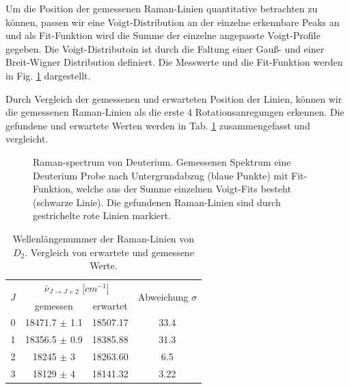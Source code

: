\documentclass[11 pt]{article}
\begin{document}
Um die Position der gemessenen Raman-Linien quantitative betrachten zu können, passen wir eine Voigt-Distribution an der einzelne erkennbare Peaks an und als Fit-Funktion wird die Summe der einzelne angepasste Voigt-Profile gegeben. Die Voigt-Distributoin ist durch die Faltung einer Gauß- und einer Breit-Wigner Distribution definiert. Die Messwerte und die Fit-Funktion werden in Fig. \ref{fig:Deuterium} dargestellt.

Durch Vergleich der gemessenen und erwarteten Position der Linien, können wir die gemessenen Raman-Linien als die erste 4 Rotationsanregungen erkennen. Die gefundene und erwartete Werten werden in Tab. \ref{tab:D2} zusammengefasst und vergleicht. 

\begin{figure}[htbp]
	\centering
   \caption{\small Raman-spectrum von Deuterium. Gemessenen Spektrum eine Deuterium Probe nach Untergrundabzug (blaue Punkte) mit Fit-Funktion, welche aus der Summe einzelnen Voigt-Fits besteht (schwarze Linie). Die gefundenen Raman-Linien sind durch gestrichelte rote Linien markiert.}
   \label{fig:Deuterium}
\end{figure}

\begin{table}[!htbp]
 \begin{center}
  \caption{\small Wellenlängenummer der Raman-Linien von $D_2$. Vergleich von erwartete und gemessene Werte.}
   \renewcommand{\arraystretch}{1.3} %
  \label{tab:D2}
  \begin{tabular}{|c|c|c|c|}
  \hline
\multirow{2}{*}{$J$}& \multicolumn{2}{c|}{$\bar{\nu}_{J\to J+2}$ [$\unit{cm^{-1}}$]} &  \multirow{2}{*}{ Abweichung $\sigma$} \\ \cline{2-3} %
 					 & gemessen & erwartet &    			\\ 
  \hline
	\hline 
0 & 18471.7	$\pm$ 1.1	& 18507.17	& 33.4 \\
1 & 18356.5	$\pm$ 0.9	& 18385.88	& 31.3 \\
2 & 18245	$\pm$ 3	& 18263.60	& 6.5	 \\
3 & 18129	$\pm$ 4		& 18141.32	& 3.22 \\
	\hline
  \end{tabular}
  \renewcommand{\arraystretch}{1} 

 \end{center}
\end{table}
\end{document}
